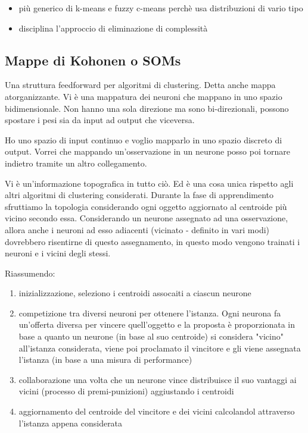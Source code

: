 \begin{itemize}
	\item pi\`u generico di k-means e fuzzy c-means perch\`e usa distribuzioni di vario tipo
	\item disciplina l'approccio di eliminazione di complessit\`a
\end{itemize}


\subsection{Mappe di Kohonen o SOMs}
Una struttura feedforward per algoritmi di clustering. Detta anche mappa atorganizzante. Vi \`e una mappatura dei neuroni che mappano in uno spazio bidimensionale. Non hanno una sola direzione ma sono bi-direzionali, possono spostare i pesi sia da input ad output che viceversa.

Ho uno spazio di input continuo e voglio mapparlo in uno spazio discreto di output. Vorrei che mappando un'osservazione in un neurone posso poi tornare indietro tramite un altro collegamento.

Vi \`e un'informazione topografica in tutto ci\`o. Ed \`e una cosa unica rispetto agli altri algoritmi di clustering considerati. Durante la fase di apprendimento sfruttiamo la topologia considerando ogni oggetto aggiornato al centroide pi\`u vicino secondo essa. Considerando un neurone assegnato ad una osservazione, allora anche i neuroni ad esso adiacenti (vicinato - definito in vari modi) dovrebbero risentirne di questo assegnamento, in questo modo vengono trainati i neuroni e i vicini degli stessi. 

Riassumendo:
\begin{enumerate}
	\item inizializzazione, seleziono i centroidi assocaiti a ciascun neurone
	\item competizione tra diversi neuroni per ottenere l'istanza. Ogni neurona fa un'offerta diversa per vincere quell'oggetto e la proposta \`e proporzionata in base a quanto un neurone (in base al suo centroide) si considera "vicino" all'istanza considerata, viene poi proclamato il vincitore e gli viene assegnata l'istanza (in base a una misura di performance)
	\item collaborazione una volta che un neurone vince distribuisce il suo vantaggi ai vicini (processo di premi-punizioni) aggiustando i centroidi
	\item aggiornamento del centroide del vincitore e dei vicini calcolandol attraverso l'istanza appena considerata
\end{enumerate} 

